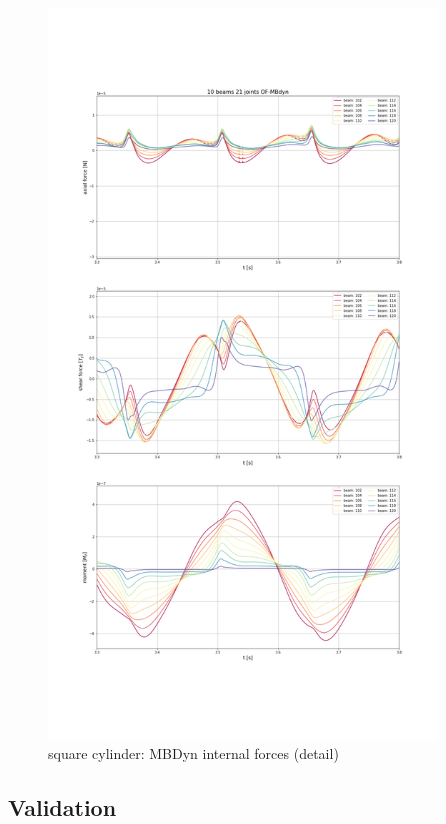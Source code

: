 \begin{figure}[htbp!]
	\centering
	\includegraphics[width=0.92\textwidth, trim=0 230 0 230, clip]{images/sq-cyl/sq-flap_OF-MBDyn_act.png}
	\caption{square cylinder: MBDyn internal forces (detail)}
	\label{fig:sq_mbd_internal}
\end{figure}


\subsection{Validation}

